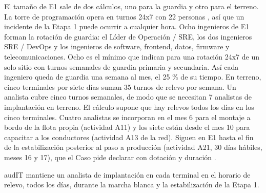 El tamaño de E1 sale de dos cálculos, uno para la guardia y otro para el terreno. La torre de
programación opera en turnos 24x7 con 22 personas , así que un incidente de la
Etapa 1 puede ocurrir a cualquier hora. Ocho ingenieros de E1 forman la rotación de guardia: el Líder
de Operación / SRE, los dos ingenieros SRE / DevOps y los ingenieros de software, frontend, datos,
firmware y telecomunicaciones. Ocho es el mínimo que \textcite{beyer2016} indican para una rotación
24x7 de un solo sitio con turnos semanales de guardia primaria y secundaria. Así cada ingeniero queda
de guardia una semana al mes, el 25 \% de su tiempo. En terreno, cinco terminales por siete días
suman 35 turnos de relevo por semana. Un analista cubre cinco turnos semanales, de modo que se
necesitan 7 analistas de implantación en terreno. El cálculo supone que hay relevos todos los días en
los cinco terminales. Cuatro analistas se incorporan en el mes 6 para el montaje a bordo de la flota propia (actividad A11)
y los siete están desde el mes 10 para capacitar a los conductores (actividad A13 de la red). Siguen en E1 hasta el fin de la estabilización posterior al paso a
producción (actividad A21, 30 días hábiles, meses 16 y 17), que el Caso pide declarar con dotación y
duración .

\begin{compromiso}[metrica={35 turnos de relevo por semana cubiertos en los cinco terminales, de la capacitación previa a la marcha blanca hasta el fin de la estabilización de la Etapa 1},
                   verifica={registro semanal de turnos firmado por el jefe de cada terminal},
                   fuente={\caso{numeral 13.3}{27}}]
audIT mantiene un analista de implantación en cada terminal en el horario de relevo, todos los días, durante la marcha blanca y la estabilización de la Etapa 1.
\end{compromiso}

